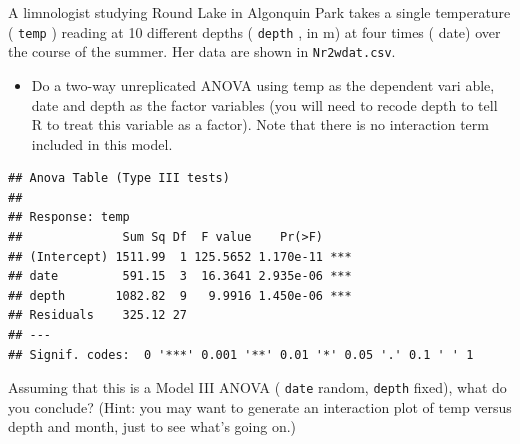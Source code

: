 \documentclass[
  12pt,
]{book}
\newenvironment{Shaded}{\begin{snugshade}}{\end{snugshade}}
\newcommand{\DataTypeTok}[1]{\textcolor[rgb]{0.13,0.29,0.53}{#1}}
\newcommand{\DecValTok}[1]{\textcolor[rgb]{0.00,0.00,0.81}{#1}}
\newcommand{\KeywordTok}[1]{\textcolor[rgb]{0.13,0.29,0.53}{\textbf{#1}}}
\newcommand{\NormalTok}[1]{#1}
\newcommand{\OperatorTok}[1]{\textcolor[rgb]{0.81,0.36,0.00}{\textbf{#1}}}
\newcommand{\StringTok}[1]{\textcolor[rgb]{0.31,0.60,0.02}{#1}}
\providecommand{\tightlist}{%
  \setlength{\itemsep}{0pt}\setlength{\parskip}{0pt}}
\begin{document}
A limnologist studying Round Lake in Algonquin Park takes a single temperature ( \texttt{temp} ) reading at 10 different depths ( \texttt{depth} , in m) at four times ( date) over the course of the summer. Her data are shown in \texttt{Nr2wdat.csv}.

\begin{itemize}
\tightlist
\item
  Do a two-way unreplicated ANOVA using temp as the dependent vari able, date and depth as the factor variables (you will need to recode depth to tell R to treat this variable as a factor). Note that there is no interaction term included in this model.
\end{itemize}

\begin{Shaded}
\end{Shaded}

\begin{verbatim}
## Anova Table (Type III tests)
## 
## Response: temp
##              Sum Sq Df  F value    Pr(>F)    
## (Intercept) 1511.99  1 125.5652 1.170e-11 ***
## date         591.15  3  16.3641 2.935e-06 ***
## depth       1082.82  9   9.9916 1.450e-06 ***
## Residuals    325.12 27                       
## ---
## Signif. codes:  0 '***' 0.001 '**' 0.01 '*' 0.05 '.' 0.1 ' ' 1
\end{verbatim}

Assuming that this is a Model III ANOVA ( \texttt{date} random, \texttt{depth} fixed), what do you conclude? (Hint: you may want to generate an interaction plot of temp versus depth and month, just to see what's going on.)

\begin{Shaded}
\end{Shaded}
\end{document}
